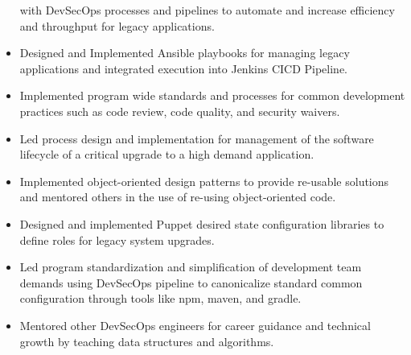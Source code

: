 \documentclass[12pt, line, margin]{res}
\begin{document}
\begin{resume}
\begin{itemize}
                          with DevSecOps processes and pipelines to automate and increase  
                          efficiency and throughput for legacy applications.
              \item   Designed and Implemented Ansible playbooks for managing legacy
                          applications and integrated execution into Jenkins CICD Pipeline.
              \item   Implemented program wide standards and processes for common 
                          development practices such as code review, code quality, and \newline
                          security waivers.
              \item   Led process design and implementation for management of the 
                          software lifecycle of a critical upgrade to a high demand \newline
                          application.
              \item   Implemented object-oriented design patterns to provide re-usable solutions
                          and mentored others in the use of re-using object-oriented code.
              \item   Designed and implemented Puppet desired state configuration \newline 
                          libraries to define roles for legacy system upgrades.
              \item   Led program standardization and simplification of development team 
                          demands using DevSecOps pipeline to canonicalize standard common
                          configuration through tools like npm, maven, and gradle.
              \item   Mentored other DevSecOps engineers for career guidance and
                          technical growth by teaching data structures and algorithms.
            \end{itemize}


\end{resume}
\end{document}

